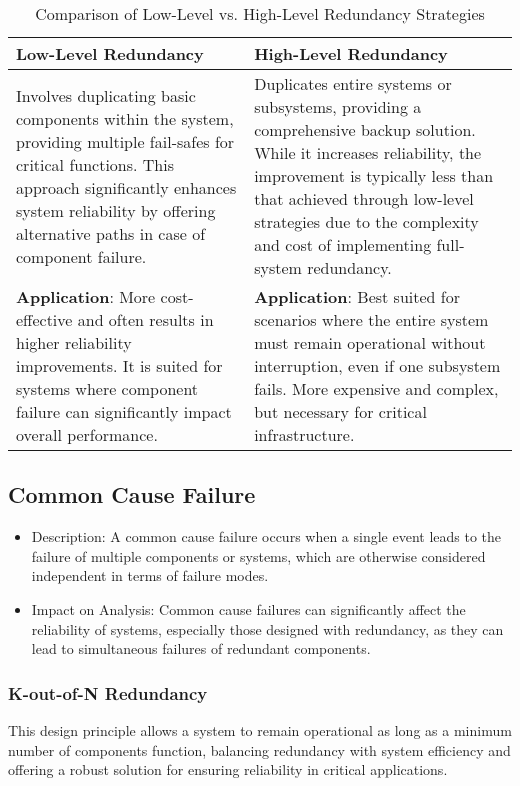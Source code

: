 \begin{table}[ht]
\centering
\begin{tabularx}{\textwidth}{X X}
\toprule
\textbf{Low-Level Redundancy} & \textbf{High-Level Redundancy} \\
\midrule
Involves duplicating basic components within the system, providing multiple fail-safes for critical functions. This approach significantly enhances system reliability by offering alternative paths in case of component failure. & Duplicates entire systems or subsystems, providing a comprehensive backup solution. While it increases reliability, the improvement is typically less than that achieved through low-level strategies due to the complexity and cost of implementing full-system redundancy. \\
\addlinespace
\textbf{Application}: More cost-effective and often results in higher reliability improvements. It is suited for systems where component failure can significantly impact overall performance. & \textbf{Application}: Best suited for scenarios where the entire system must remain operational without interruption, even if one subsystem fails. More expensive and complex, but necessary for critical infrastructure. \\
\bottomrule
\end{tabularx}
\caption{Comparison of Low-Level vs. High-Level Redundancy Strategies}
\label{table:redundancy_comparison}
\end{table}

\subsection*{Common Cause Failure}

\begin{itemize}
    \item Description: A common cause failure occurs when a single event leads to the failure of multiple components or systems, which are otherwise considered independent in terms of failure modes.
    \item Impact on Analysis: Common cause failures can significantly affect the reliability of systems, especially those designed with redundancy, as they can lead to simultaneous failures of redundant components.
\end{itemize}

\subsubsection*{K-out-of-N Redundancy}
This design principle allows a system to remain operational as long as a minimum number of components function, balancing redundancy with system efficiency and offering a robust solution for ensuring reliability in critical applications.